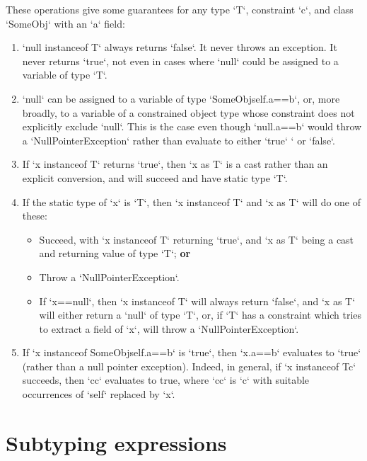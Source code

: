 These operations give some guarantees for any type \xcd`T`, constraint
\xcd`c`, and class 
\xcd`SomeObj` with an \xcd`a` field:
\begin{enumerate}
\item \xcd`null instanceof T` always returns \xcd`false`.  It never throws an
      exception.  It 
      never returns \xcd`true`, not even in cases where \xcd`null` could be
      assigned to a variable of type \xcd`T`.  
\item \xcd`null` can be assigned to a variable of type
      \xcd`SomeObj{self.a==b}`, or, more broadly, to a variable 
      of a constrained object type whose constraint does not explicitly
      exclude \xcd`null`.  This is the case even though \xcd`null.a==b` would
      throw a \xcd`NullPointerException` rather than evaluate to either
      \xcd`true` `
      or \xcd`false`.
\item If \xcd`x instanceof T` returns \xcd`true`, then \xcd`x as T` is a cast
      rather than an explicit conversion, and will succeed and have static
      type \xcd`T`.
\item If the static type of \xcd`x` is \xcd`T`, then \xcd`x instanceof T` and
      \xcd`x as T` will do one of these: 
      \begin{itemize}
      \item Succeed, with \xcd`x instanceof T` returning \xcd`true`, and 
            \xcd`x as T` being a cast and returning value of type \xcd`T`; {\bf or}

      \item Throw a \xcd`NullPointerException`.
      \item If \xcd`x==null`, then \xcd`x instanceof T` will always return
            \xcd`false`, and \xcd`x as T` will either return a \xcd`null` of
            type \xcd`T`, or, if \xcd`T` has a constraint which tries to
            extract a field of \xcd`x`, will throw a \xcd`NullPointerException`.
      \end{itemize}
\item If \xcd`x instanceof SomeObj{self.a==b}` is \xcd`true`, then \xcd`x.a==b`
      evaluates to \xcd`true` (rather than a null pointer exception).  Indeed, 
      in general, if \xcd`x instanceof T{c}` succeeds, then \xcd`cc` evaluates
      to true, where \xcd`cc` is \xcd`c` with suitable occurrences of
      \xcd`self` replaced by \xcd`x`.  
\end{enumerate}



\section{Subtyping expressions}
\index{\Xcd{<:}}
\index{\Xcd{:>}}



